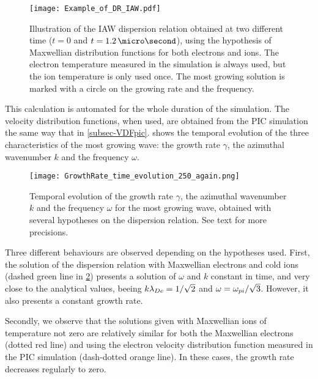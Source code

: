   \begin{figure}[hbtp]
    \centering
    \texttt{[image: Example\_of\_DR\_IAW.pdf]}
    \caption{Illustration of the \ac{IAW} dispersion relation obtained at two different time ($t=0$ and $t=1.2\,\micro\second$), using the hypothesis of Maxwellian distribution functions for both electrons and ions. The electron temperature measured in the simulation is always used, but the ion temperature is only used once. The most growing solution is marked with a circle on the growing rate and the frequency.}
    \label{fig-Example_of_DR_IAW}
  \end{figure}
  
  
  This calculation is automated for the whole duration of the simulation.
  The velocity distribution functions, when used, are obtained from the \ac{PIC} simulation the same way that in \cref{subsec-VDFpic}.
   shows the temporal evolution of the three characteristics of the most growing wave: the growth rate $\gamma$, the azimuthal wavenumber $k$ and the frequency $\omega$.
  \begin{figure}[hbtp]
    \centering
    \texttt{[image: GrowthRate\_time\_evolution\_250\_again.png]}  %
    \caption{Temporal evolution of the growth rate $\gamma$, the azimuthal wavenumber $k$ and the frequency $\omega$ for the most growing wave, obtained with several hypotheses on the dispersion relation. See text for more precisions. }
    \label{fig-time_wave}
  \end{figure}
  
  Three different behaviours are observed depending on the hypotheses used.
  First, the solution of the dispersion relation with Maxwellian electrons and cold ions (dashed green line in \cref{fig-time_wave}) presents a solution of $\omega$ and $k$ constant in time, and very close to the analytical values, beeing $k \lambda_{De} = 1/\sqrt{2}$ and $\omega = \omega_{pi}/\sqrt{3}$.
  However, it also presents a constant growth rate.
  
  Secondly, we observe that the solutions given with Maxwellian ions of temperature not zero are relatively similar for both the Maxwellian electrons  (dotted red line) and using the electron velocity distribution function measured in the \ac{PIC} simulation (dash-dotted orange line).
  In these cases, the growth rate decreases regularly to zero.
  
